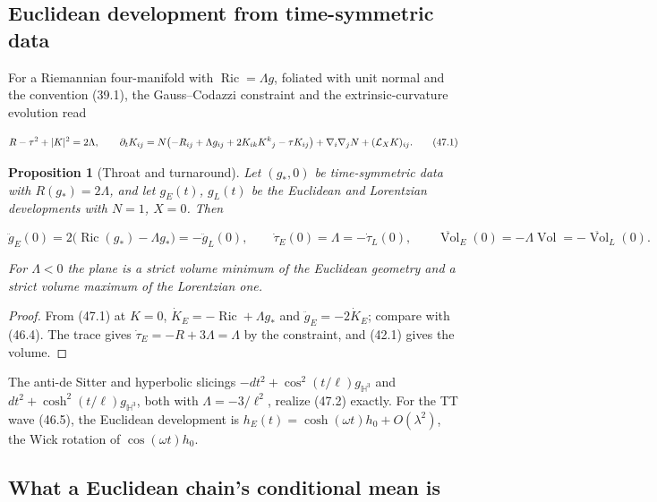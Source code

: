 \documentclass[11pt]{article}
\newtheorem{proposition}[theorem]{Proposition}
\theoremstyle{remark}
\begin{document}
\subsection{Euclidean development from time-symmetric data}

For a Riemannian four-manifold with \(\operatorname{Ric}=\Lambda g\),
foliated with unit normal and the convention (39.1), the Gauss--Codazzi
constraint and the extrinsic-curvature evolution read

\[
 R-\tau^2+|K|^2=2\Lambda,\qquad
 \partial_tK_{ij}=N\bigl(-R_{ij}+\Lambda g_{ij}+2K_{ik}K^k{}_j-\tau K_{ij}\bigr)
 +\nabla_i\nabla_jN+({\cal L}_XK)_{ij}.                               \tag{47.1}
\]

\begin{proposition}[Throat and turnaround]
\label{prop:v19v44-throat}
Let \((g_*,0)\) be time-symmetric data with \(R(g_*)=2\Lambda\), and
let \(g_E(t)\), \(g_L(t)\) be the Euclidean and Lorentzian developments
with \(N=1\), \(X=0\).  Then

\[
 \ddot g_E(0)=2\bigl(\operatorname{Ric}(g_*)-\Lambda g_*\bigr)=-\ddot g_L(0),
 \qquad
 \dot\tau_E(0)=\Lambda=-\dot\tau_L(0),
 \qquad
 \ddot{\operatorname{Vol}}_E(0)=-\Lambda\operatorname{Vol}=-\ddot{\operatorname{Vol}}_L(0).
                                                                    \tag{47.2}
\]

For \(\Lambda<0\) the plane is a strict volume minimum of the Euclidean
geometry and a strict volume maximum of the Lorentzian one.
\end{proposition}

\begin{proof}
From (47.1) at \(K=0\), \(\dot K_E=-\operatorname{Ric}+\Lambda g_*\)
and \(\ddot g_E=-2\dot K_E\); compare with (46.4).  The trace gives
\(\dot\tau_E=-R+3\Lambda=\Lambda\) by the constraint, and (42.1) gives
the volume.
\end{proof}

The anti-de Sitter and hyperbolic slicings
\(-dt^2+\cos^2(t/\ell)g_{\mathbb H^3}\) and
\(dt^2+\cosh^2(t/\ell)g_{\mathbb H^3}\), both with \(\Lambda=-3/\ell^2\),
realize (47.2) exactly.  For the TT wave (46.5), the Euclidean
development is \(h_E(t)=\cosh(\omega t)h_0+O(\lambda^2)\), the Wick
rotation of \(\cos(\omega t)h_0\).

\subsection{What a Euclidean chain's conditional mean is}
\end{document}
